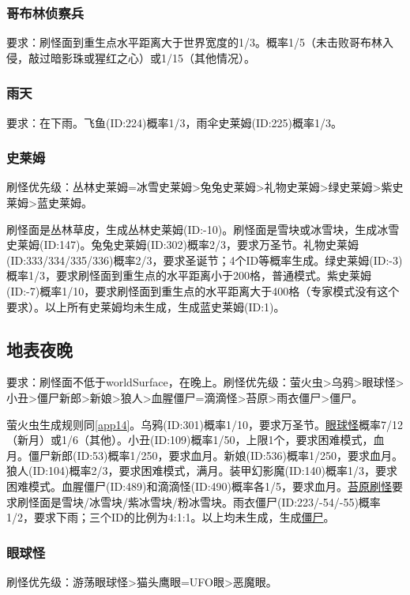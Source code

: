\subsubsection{哥布林侦察兵}
要求：刷怪面到重生点水平距离大于世界宽度的1/3。概率1/5（未击败哥布林入侵，敲过暗影珠或猩红之心）或1/15（其他情况）。

\subsubsection{雨天}
要求：在下雨。飞鱼(ID:224)概率1/3，雨伞史莱姆(ID:225)概率1/3。

\subsubsection{史莱姆}
刷怪优先级：丛林史莱姆=冰雪史莱姆>兔兔史莱姆>礼物史莱姆>绿史莱姆>紫史莱姆>蓝史莱姆。

刷怪面是丛林草皮，生成丛林史莱姆(ID:-10)。刷怪面是雪块或冰雪块，生成冰雪史莱姆(ID:147)。兔兔史莱姆(ID:302)概率2/3，要求万圣节。礼物史莱姆(ID:333/334/335/336)概率2/3，要求圣诞节；4个ID等概率生成。绿史莱姆(ID:-3)概率1/3，要求刷怪面到重生点的水平距离小于200格，普通模式。紫史莱姆(ID:-7)概率1/10，要求刷怪面到重生点的水平距离大于400格（专家模式没有这个要求）。以上所有史莱姆均未生成，生成蓝史莱姆(ID:1)。

\subsection{地表夜晚}
要求：刷怪面不低于worldSurface，在晚上。刷怪优先级：萤火虫>乌鸦>眼球怪>小丑>僵尸新郎>新娘>狼人>血腥僵尸=滴滴怪>苔原>雨衣僵尸>僵尸。

萤火虫生成规则同\autoref{app14}。乌鸦(ID:301)概率1/10，要求万圣节。\hyperref[app15]{眼球怪}概率7/12（新月）或1/6（其他）。小丑(ID:109)概率1/50，上限1个，要求困难模式，血月。僵尸新郎(ID:53)概率1/250，要求血月。新娘(ID:536)概率1/250，要求血月。狼人(ID:104)概率2/3，要求困难模式，满月。装甲幻影魔(ID:140)概率1/3，要求困难模式。血腥僵尸(ID:489)和滴滴怪(ID:490)概率各1/5，要求血月。\hyperref[app16]{苔原刷怪}要求刷怪面是雪块/冰雪块/紫冰雪块/粉冰雪块。雨衣僵尸(ID:223/-54/-55)概率1/2，要求下雨；三个ID的比例为4:1:1。以上均未生成，生成\hyperref[app17]{僵尸}。

\subsubsection{眼球怪}\label{app15}
刷怪优先级：游荡眼球怪>猫头鹰眼=UFO眼>恶魔眼。

